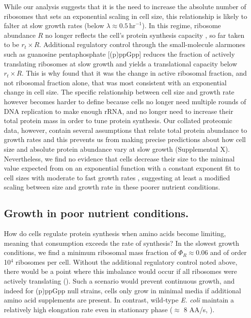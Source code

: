 While our analysis suggests that it is the need to increase the absolute number
of ribosomes that sets an exponential scaling in cell size, this relationship is
likely to falter at slow growth rates (below $\lambda \approx
0.5\,\text{hr}^{-1}$). In this regime, ribosome abundance $R$ no longer reflects
the cell's protein synthesis capacity \citep{dai2016}, so far taken to be $r_t
\times R$. Additional regulatory control through the small-molecule alarmones such as
guanosine pentaphosphate [(p)ppGpp] reduces the fraction of actively translating
ribosomes at slow growth and yields a translational capacity below $r_t\times R$. This
is why \cite{si2017} found that it was the change in active ribosomal fraction,
and not ribosomal fraction alone, that was most consistent with an exponential
change in cell size. The specific relationship between cell size and growth rate
however becomes harder to define because cells no longer need multiple rounds of
DNA replication to make enough rRNA, and no longer need to increase their total
protein mass in order to tune protein synthesis. Our collated proteomic data,
however, contain several assumptions that relate total protein abundance to
growth rates and this prevents us from making precise predictions about how cell
size and absolute protein abundance vary at slow growth (Supplemental X).
Nevertheless, we find no evidence that cells decrease their size to the minimal
value expected from on an exponential function with a constant exponent fit to
cell sizes with moderate to fast growth rates \citep{basan2015, radzikowski2016,
si2019}, suggesting at least a modified scaling between size and growth rate in
these poorer nutrient conditions.

\subsection{Growth in poor nutrient conditions.}

How do cells regulate protein synthesis when amino acids become limiting,
meaning that consumption exceeds the rate of synthesis? In the slowest  growth
conditions, we find a minimum ribosomal mass fraction of $\Phi_R \approx 0.06$
and  of order 10$^4$ ribosomes per cell.   Without the additional regulatory
control noted above, there would be a point where  this imbalance would occur if
all ribosomes were actively translating  (). Such a
scenario would prevent continuous growth, and indeed for (p)ppGpp null strains,
cells only grow in minimal media if additional amino acid supplements are
present. In contrast, wild-type \textit{E. coli} maintain a relatively high
elongation rate even in stationary phase ($\approx$ 8 AA/s, \citep{dai2016,
dai2018}).

